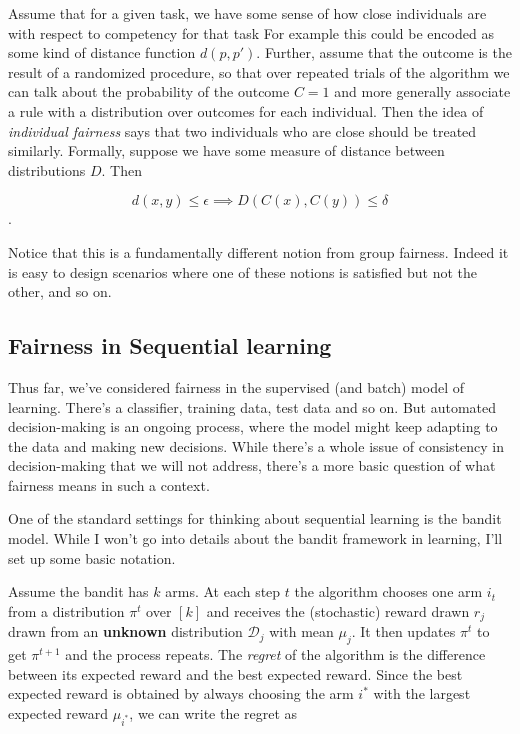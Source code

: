 \documentclass[11pt]{paper}
\begin{document}
Assume that for a given task, we have some sense of how close
individuals are with respect to competency for that task For example
this could be encoded as some kind of distance function $d(p, p')$.
Further, assume that the outcome is the result of a randomized
procedure, so that over repeated trials of the algorithm we can talk
about the probability of the outcome $C = 1$ and more generally
associate a rule with a distribution over outcomes for each individual.
Then the idea of \emph{individual fairness} says that two individuals
who are close should be treated similarly. Formally, suppose we have
some measure of distance between distributions $D$. Then

\[ d(x,y) \le \epsilon \implies D(C(x), C(y)) \le \delta\].

Notice that this is a fundamentally different notion from group
fairness. Indeed it is easy to design scenarios where one of these
notions is satisfied but not the other, and so on.

\subsection{Fairness in Sequential
learning}\label{fairness-in-sequential-learning}

Thus far, we've considered fairness in the supervised (and batch) model
of learning. There's a classifier, training data, test data and so on.
But automated decision-making is an ongoing process, where the model
might keep adapting to the data and making new decisions. While there's
a whole issue of consistency in decision-making that we will not
address, there's a more basic question of what fairness means in such a
context.

One of the standard settings for thinking about sequential learning is
the bandit model. While I won't go into details about the bandit
framework in learning, I'll set up some basic notation.

Assume the bandit has $k$ arms. At each step $t$ the algorithm chooses
one arm $i_t$ from a distribution $\pi^t$ over $[k]$ and receives the
(stochastic) reward drawn $r_j$ drawn from an \textbf{unknown}
distribution $\mathcal{D}_j$ with mean $\mu_j$. It then updates $\pi^t$
to get $\pi^{t+1}$ and the process repeats. The \emph{regret} of the
algorithm is the difference between its expected reward and the best
expected reward. Since the best expected reward is obtained by always
choosing the arm $i^*$ with the largest expected reward $\mu_{i^*}$, we
can write the regret as
\end{document}
